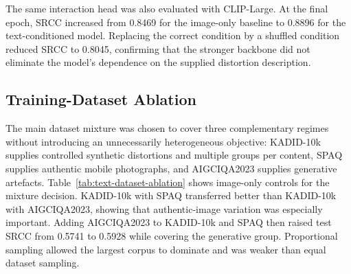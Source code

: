 \documentclass{article}
\begin{document}
The same interaction head was also evaluated with CLIP-Large. At the final epoch, SRCC increased from 0.8469 for the image-only baseline to 0.8896 for the text-conditioned model. Replacing the correct condition by a shuffled condition reduced SRCC to 0.8045, confirming that the stronger backbone did not eliminate the model's dependence on the supplied distortion description.

\subsection{Training-Dataset Ablation}

The main dataset mixture was chosen to cover three complementary regimes without introducing an unnecessarily heterogeneous objective: KADID-10k supplies controlled synthetic distortions and multiple groups per content, SPAQ supplies authentic mobile photographs, and AIGCIQA2023 supplies generative artefacts. Table~\ref{tab:text-dataset-ablation} shows image-only controls for the mixture decision. KADID-10k with SPAQ transferred better than KADID-10k with AIGCIQA2023, showing that authentic-image variation was especially important. Adding AIGCIQA2023 to KADID-10k and SPAQ then raised test SRCC from 0.5741 to 0.5928 while covering the generative group. Proportional sampling allowed the largest corpus to dominate and was weaker than equal dataset sampling.

\begin{table}[htbp]
\centering
\small
\setlength{\tabcolsep}{5pt}
\caption{Training-dataset and sampling ablation using image-only CLIP-Base controls.}
\label{tab:text-dataset-ablation}
\end{table}
\end{document}
